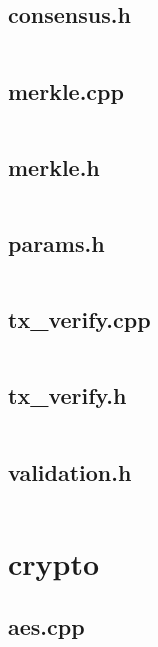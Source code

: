 \documentclass{article}
\begin{document}
\subsection{consensus.h}
\inputminted{cpp}{/home/dufferzafar/dev/@clones/bitcoin/src/consensus/consensus.h}
\newpage

\subsection{merkle.cpp}
\inputminted{cpp}{/home/dufferzafar/dev/@clones/bitcoin/src/consensus/merkle.cpp}
\newpage

\subsection{merkle.h}
\inputminted{cpp}{/home/dufferzafar/dev/@clones/bitcoin/src/consensus/merkle.h}
\newpage

\subsection{params.h}
\inputminted{cpp}{/home/dufferzafar/dev/@clones/bitcoin/src/consensus/params.h}
\newpage

\subsection{tx\_verify.cpp}
\inputminted{cpp}{/home/dufferzafar/dev/@clones/bitcoin/src/consensus/tx_verify.cpp}
\newpage

\subsection{tx\_verify.h}
\inputminted{cpp}{/home/dufferzafar/dev/@clones/bitcoin/src/consensus/tx_verify.h}
\newpage

\subsection{validation.h}
\inputminted{cpp}{/home/dufferzafar/dev/@clones/bitcoin/src/consensus/validation.h}
\newpage

\section{crypto}

\subsection{aes.cpp}
\inputminted{cpp}{/home/dufferzafar/dev/@clones/bitcoin/src/crypto/aes.cpp}
\newpage
\end{document}
